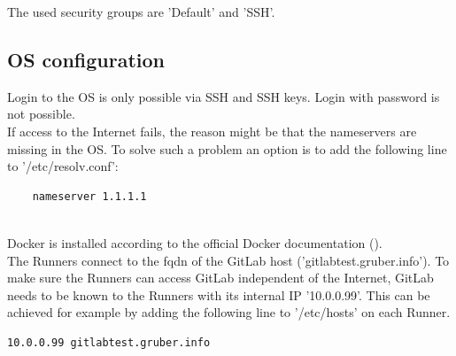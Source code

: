 The used security groups are 'Default' and 'SSH'.

\subsection{OS configuration}

Login to the OS is only possible via SSH and SSH keys. Login with password is not possible.\\

If access to the Internet fails, the reason might be that the nameservers are missing in the OS.
To solve such a problem an option is to add the following line to '/etc/resolv.conf':
\begin{lstlisting}
	nameserver 1.1.1.1
\end{lstlisting}
\  \\
Docker is installed according to the official Docker documentation (\cite{refDockerDebian}).\\

The Runners connect to the \ac{fqdn} of the GitLab host ('gitlabtest.gruber.info').
To make sure the Runners can access GitLab independent of the Internet, GitLab needs to be known to the Runners with its internal IP '10.0.0.99'.
This can be achieved for example by adding the following line to '/etc/hosts' on each Runner.
\begin{lstlisting}
10.0.0.99 gitlabtest.gruber.info
\end{lstlisting}
